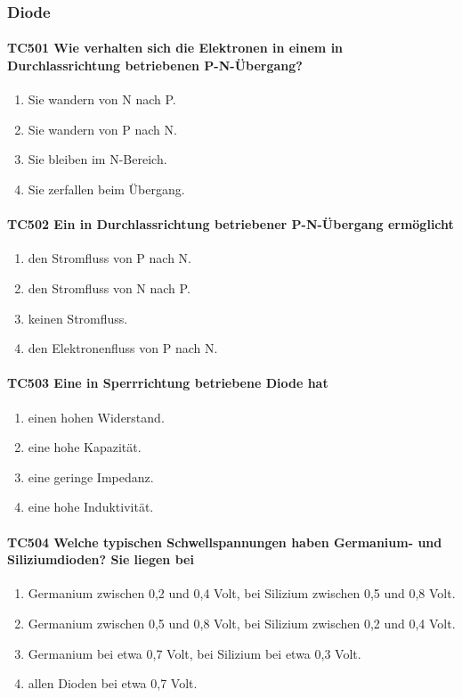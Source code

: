 \documentclass[8pt]{article}
\begin{document}
\begin{enumerate}
\begin{enumerate}[nolistsep,label=\Alph*]
{\pagebreak
\subsubsection{Diode}
\paragraph*{TC501 Wie verhalten sich die Elektronen in einem in Durchlassrichtung betriebenen P-N-Übergang?}
\begin{enumerate}[nolistsep,label=\Alph*]
\item Sie wandern von N nach P.
\item Sie wandern von P nach N.
\item Sie bleiben im N-Bereich.
\item Sie zerfallen beim Übergang.
\end{enumerate}

\paragraph*{TC502 Ein in Durchlassrichtung betriebener P-N-Übergang ermöglicht}
\begin{enumerate}[nolistsep,label=\Alph*]
\item den Stromfluss von P nach N.
\item den Stromfluss von N nach P.
\item keinen Stromfluss.
\item den Elektronenfluss von P nach N.
\end{enumerate}

\paragraph*{TC503 Eine in Sperrrichtung betriebene Diode hat}
\begin{enumerate}[nolistsep,label=\Alph*]
\item einen hohen Widerstand.
\item eine hohe Kapazität.
\item eine geringe Impedanz.
\item eine hohe Induktivität.
\end{enumerate}

\paragraph*{TC504 Welche typischen Schwellspannungen haben Germanium- und Siliziumdioden? Sie liegen bei}
\begin{enumerate}[nolistsep,label=\Alph*]
\item Germanium zwischen 0,2 und 0,4 Volt, bei Silizium zwischen 0,5 und 0,8 Volt.
\item Germanium zwischen 0,5 und 0,8 Volt, bei Silizium zwischen 0,2 und 0,4 Volt.
\item Germanium bei etwa 0,7 Volt, bei Silizium bei etwa 0,3 Volt.
\item allen Dioden bei etwa 0,7 Volt.
\end{enumerate}

}
\end{enumerate}
\end{enumerate}
\end{document}
